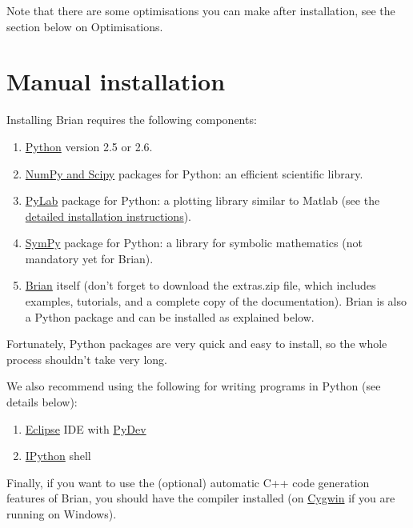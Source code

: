 \documentclass[letterpaper,10pt,english]{manual}
\begin{document}
Note that there are some optimisations you can make after installation, see the
section below on Optimisations.


\section{Manual installation}

Installing Brian requires the following components:
\begin{enumerate}
\item {} 
\href{http://www.python.org/download/}{Python} version 2.5 or 2.6.

\item {} 
\href{http://www.scipy.org/Download}{NumPy and Scipy} packages for Python:
an efficient scientific library.

\item {} 
\href{http://matplotlib.sourceforge.net/}{PyLab} package for Python:
a plotting library similar to Matlab
(see the \href{http://matplotlib.sourceforge.net/installing.html}{detailed installation instructions}).

\item {} 
\href{http://code.google.com/p/sympy/}{SymPy} package for Python:
a library for symbolic mathematics (not mandatory yet for Brian).

\item {} 
\href{http://neuralensemble.org/trac/brian/wiki/Downloads}{Brian} itself (don't forget to download the extras.zip file,
which includes examples, tutorials, and a complete copy of the documentation).
Brian is also a Python package and can be installed as explained below.

\end{enumerate}

Fortunately, Python packages are very quick and easy to install, so the whole process shouldn't
take very long.

We also recommend using the following for writing programs in Python (see details below):
\begin{enumerate}
\item {} 
\href{http://www.eclipse.org/}{Eclipse} IDE with \href{http://pydev.sourceforge.net/}{PyDev}

\item {} 
\href{http://ipython.scipy.org/moin/}{IPython} shell

\end{enumerate}

Finally, if you want to use the (optional) automatic C++ code generation features of Brian, you should
have the  compiler installed (on \href{http://www.cygwin.com/}{Cygwin} if you are
running on Windows).
\end{document}

